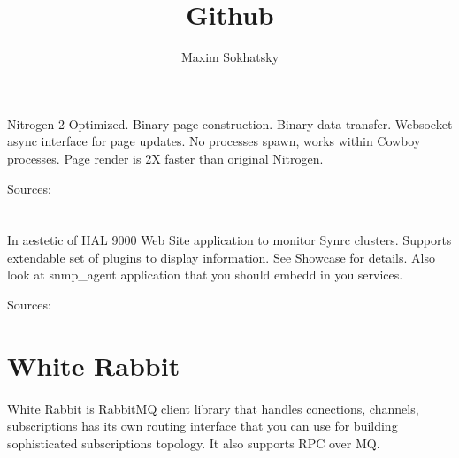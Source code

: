 \documentclass[11pt]{article}
\begin{document}
\title{Github}
\author{Maxim Sokhatsky}


\section*{}
\paragraph{}
Nitrogen 2 Optimized. Binary page construction. Binary data transfer.
Websocket async interface for page updates. No processes spawn, works
within Cowboy processes. Page render is 2X faster than original Nitrogen.

Sources: 

\section*{}
\paragraph{}
In aestetic of HAL 9000 Web Site application to monitor Synrc clusters.
Supports extendable set of plugins to display information. See Showcase for details.
Also look at snmp_agent application that you should embedd in you services.

Sources: 

\section*{White Rabbit}
\paragraph{}
White Rabbit is RabbitMQ client library that handles conections, channels,
subscriptions has its own routing interface that you can use for building
sophisticated subscriptions topology. It also supports RPC over MQ.
\end{document}
